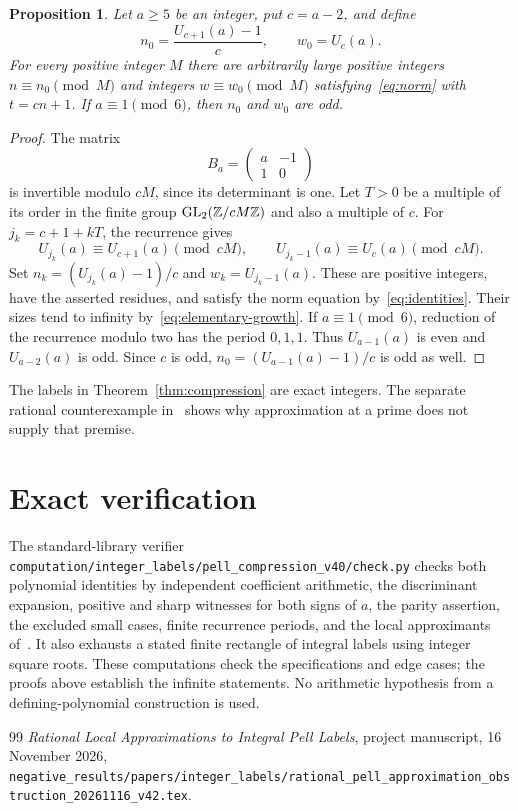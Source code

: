 \documentclass[11pt,a4paper]{article}
\newtheorem{proposition}[theorem]{Proposition}
\begin{document}
\begin{proposition}\label{prop:progressions}
Let $a\ge5$ be an integer, put $c=a-2$, and define
\[
 n_0=\frac{U_{c+1}(a)-1}{c},\qquad w_0=U_c(a).
\]
For every positive integer $M$ there are arbitrarily large positive
integers $n\equiv n_0\pmod M$ and integers $w\equiv w_0\pmod M$
satisfying~\eqref{eq:norm} with $t=cn+1$.
If $a\equiv1\pmod6$, then $n_0$ and $w_0$ are odd.
\end{proposition}
\begin{proof}
The matrix
\[
                    B_a=\begin{pmatrix}a&-1\\1&0\end{pmatrix}
\]
is invertible modulo $cM$, since its determinant is one. Let $T>0$
be a multiple of its order in the finite group
$\operatorname{GL}_2(\mathbb Z/cM\mathbb Z)$ and also a multiple of $c$.
For $j_k=c+1+kT$, the recurrence gives
\[
 U_{j_k}(a)\equiv U_{c+1}(a)\pmod{cM},\qquad
 U_{j_k-1}(a)\equiv U_c(a)\pmod{cM}.
\]
Set $n_k=(U_{j_k}(a)-1)/c$ and $w_k=U_{j_k-1}(a)$.
These are positive integers, have the asserted residues, and satisfy
the norm equation by~\eqref{eq:identities}. Their sizes tend to infinity
by~\eqref{eq:elementary-growth}.
If $a\equiv1\pmod6$, reduction of the recurrence modulo two has the
period $0,1,1$. Thus $U_{a-1}(a)$ is even and $U_{a-2}(a)$ is odd.
Since $c$ is odd, $n_0=(U_{a-1}(a)-1)/c$ is odd as well.
\end{proof}


The labels in Theorem~\ref{thm:compression} are exact integers.
The separate rational counterexample in~\cite{LocalApproximation}
shows why approximation at a prime does not supply that premise.

\section*{Exact verification}
The standard-library verifier
\nolinkurl{computation/integer_labels/pell_compression_v40/check.py}
checks both polynomial identities by independent coefficient arithmetic,
the discriminant expansion, positive and sharp witnesses for both signs
of $a$, the parity assertion, the excluded small cases, finite recurrence
periods, and the local approximants of~\cite{LocalApproximation}.
It also exhausts a stated
finite rectangle of integral labels using integer square roots.
These computations check the specifications and edge cases; the proofs
above establish the infinite statements. No arithmetic hypothesis from
a defining-polynomial construction is used.

\begin{thebibliography}{99}
\emph{Rational Local Approximations to Integral Pell Labels},
project manuscript, 16 November 2026,
\nolinkurl{negative_results/papers/integer_labels/rational_pell_approximation_obstruction_20261116_v42.tex}.
\end{thebibliography}
\end{document}
